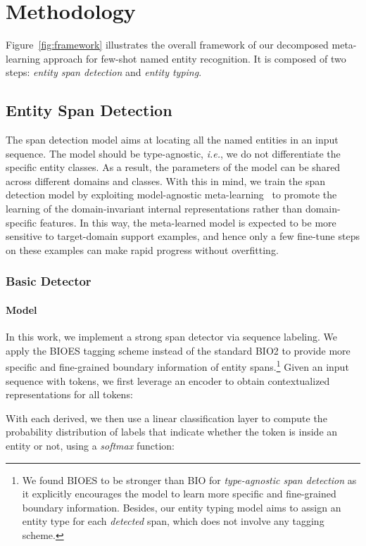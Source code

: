 \documentclass[11pt]{article}
\newcommand\ie{\textit{i.e.}}
\begin{document}
\section{Methodology}
Figure~\ref{fig:framework} illustrates the overall framework of our decomposed meta-learning approach for few-shot named entity recognition.
It is composed of two steps: \emph{entity span detection} and \emph{entity typing}.


\subsection{Entity Span Detection}
The span detection model aims at locating all the named entities in an input sequence.
The model should be type-agnostic, \ie, we do not differentiate the specific entity classes.
As a result, the parameters of the model can be shared across different domains and classes.
With this in mind, we train the span detection model by exploiting model-agnostic meta-learning~\citep{finn2017model} to promote the learning of the domain-invariant internal representations rather than domain-specific features.
In this way, the meta-learned model is expected to be more sensitive to target-domain support examples, and hence only a few fine-tune steps on these examples can make rapid progress without overfitting.

\subsubsection{Basic Detector}
\paragraph{Model}
In this work, we implement a strong span detector via sequence labeling. We apply the BIOES tagging scheme instead of the standard BIO2 to provide more specific and fine-grained boundary information of entity spans.\footnote{We found BIOES to be stronger than BIO for \textit{type-agnostic span detection} as it explicitly encourages the model to learn more specific and fine-grained boundary information. Besides, our entity typing model aims to assign an entity type for each \textit{detected} span, which does not involve any tagging scheme.}
Given an input sequence  with  tokens, we first leverage an encoder  to obtain contextualized representations  for all tokens:


With each  derived, we then use a linear classification layer to compute the probability distribution of labels that indicate whether the token  is inside an entity or not, using a \textit{softmax} function:
\end{document}
